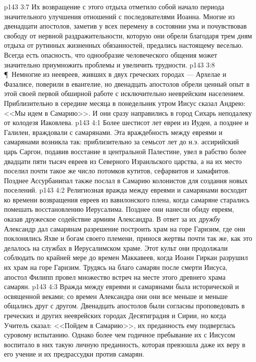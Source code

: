 \vs p143 3:7 Их возвращение с этого отдыха отметило собой начало периода значительного улучшения отношений с последователями Иоанна. Многие из двенадцати апостолов, заметив у всех перемену в состоянии ума и почувствовав свободу от нервной раздражительности, которую они обрели благодаря трем дням отдыха от рутинных жизненных обязанностей, предались настоящему веселью. Всегда есть опасность, что однообразие человеческого общения может значительно приумножить проблемы и увеличить трудности.
\vs p143 3:8 \P\ Немногие из неевреев, живших в двух греческих городах --- Архелае и Фазалисе, поверили в евангелие, но двенадцать апостолов обрели ценный опыт в этой своей первой обширной работе с исключительно нееврейским населением. Приблизительно в середине месяца в понедельник утром Иисус сказал Андрею: <<Мы идем в Самарию>>. И они сразу направились в город Сихарь неподалеку от колодезя Иаковлева.
\vs p143 4:1 Более шестисот лет евреи из Иудеи, а позднее и Галилеи, враждовали с самарянами. Эта враждебность между евреями и самарянами возникла так: приблизительно за семьсот лет до н.э. ассирийский царь Саргон, подавив восстание в центральной Палестине, увел в рабство более двадцати пяти тысяч евреев из Северного Израильского царства, а на их место поселил почти такое же число потомков кутитов, сефарвитов и хамафитов. Позднее Ассурбанипал также послал в Самарию колонистов для создания новых поселений.
\vs p143 4:2 Религиозная вражда между евреями и самарянами восходит ко времени возвращения евреев из вавилонского плена, когда самаряне старались помешать восстановлению Иерусалима. Позднее они нанесли обиду евреям, оказав дружеское содействие армиям Александра. В ответ за их дружбу Александр дал самарянам разрешение построить храм на горе Гаризим, где они поклонялись Яхве и богам своего племени, принося жертвы почти так же, как это делалось на службах в Иерусалимском храме. Этот культ они продолжали соблюдать по крайней мере до времен Маккавеев, когда Иоанн Гиркан разрушил их храм на горе Гаризим. Трудясь на благо самарян после смерти Иисуса, апостол Филипп провел множество встреч на месте этого древнего храма самарян.
\vs p143 4:3 Вражда между евреями и самарянами была исторической и освященной веками; со времен Александра они они все меньше и меньше общались друг с другом. Двенадцать апостолов были согласны проповедовать в греческих и других нееврейских городах Десятиградия и Сирии, но когда Учитель сказал: <<Пойдем в Самарию>>, их преданность ему подверглась суровому испытанию. Однако более чем годичное пребывание их с Иисусом воспитало в них такую личную преданность, которая превзошла даже их веру в его учение и их предрассудки против самарян.
